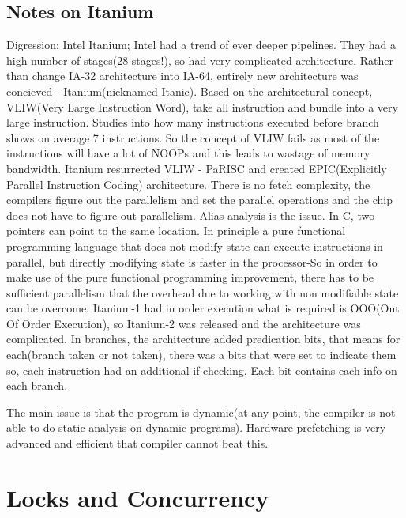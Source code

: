 \documentclass[twoside]{article}
\begin{document}
\subsection{Notes on Itanium}

Digression: Intel Itanium; Intel had a trend of ever deeper pipelines. They had a high number of stages(28 stages!), so had very complicated architecture. Rather than change IA-32 architecture into IA-64, entirely new architecture was concieved - Itanium(nicknamed Itanic). Based on the architectural concept, VLIW(Very Large Instruction Word), take all instruction and bundle into a very large instruction. Studies into how many instructions executed before branch shows on average 7 instructions. So the concept of VLIW fails as most of the instructions will have a lot of NOOPs and this leads to wastage of memory bandwidth. Itanium resurrected VLIW - PaRISC and created EPIC(Explicitly Parallel Instruction Coding) architecture. There is no fetch complexity, the compilers figure out the parallelism and set the parallel operations and the chip does not have to figure out parallelism. Alias analysis is the issue. In C, two pointers can point to the same location. In principle a pure functional programming language that does not modify state can execute instructions in parallel, but directly modifying state is faster in the processor-So in order to make use of the pure functional programming improvement, there has to be sufficient parallelism that the overhead due to working with non modifiable state can be overcome. Itanium-1 had in order execution what is required is OOO(Out Of Order Execution), so Itanium-2 was released and the architecture was complicated. In branches, the architecture added predication bits, that means for each(branch taken or not taken), there was a bits that were set to indicate them so, each instruction had an additional if checking. Each bit contains each info on each branch.

The main issue is that the program is dynamic(at any point, the compiler is not able to do static analysis on dynamic programs). Hardware prefetching is very advanced and efficient that compiler cannot beat this.

\section{Locks and Concurrency}
\end{document}
